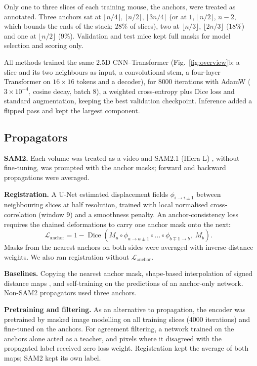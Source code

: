 Only one to three slices of each training mouse, the anchors, were treated as annotated. Three anchors sat at $\lfloor n/4\rfloor$, $\lfloor n/2\rfloor$, $\lfloor 3n/4\rfloor$ (or at $1$, $\lfloor n/2\rfloor$, $n-2$, which bounds the ends of the stack; 28\% of slices), two at $\lfloor n/3\rfloor$, $\lfloor 2n/3\rfloor$ (18\%) and one at $\lfloor n/2\rfloor$ (9\%). Validation and test mice kept full masks for model selection and scoring only.

All methods trained the same 2.5D CNN--Transformer (Fig.~\ref{fig:overview}b; a slice and its two neighbours as input, a convolutional stem, a four-layer Transformer on $16\times16$ tokens and a decoder), for 8000 iterations with AdamW ($3\times10^{-4}$, cosine decay, batch 8), a weighted cross-entropy plus Dice loss and standard augmentation, keeping the best validation checkpoint. Inference added a flipped pass and kept the largest component.

\subsection{Propagators}
\label{sec:prop}

\textbf{SAM2.} Each volume was treated as a video and SAM2.1 (Hiera-L) \cite{ravi2024sam2}, without fine-tuning, was prompted with the anchor masks; forward and backward propagations were averaged.

\textbf{Registration.} A U-Net estimated displacement fields $\phi_{i\to i\pm1}$ between neighbouring slices at half resolution, trained with local normalised cross-correlation (window 9) and a smoothness penalty. An anchor-consistency loss requires the chained deformations to carry one anchor mask onto the next:
\begin{equation}
\mathcal{L}_{\text{anchor}} = 1 - \operatorname{Dice}\!\left(M_a \circ \phi_{a\to a\pm1} \circ \dots \circ \phi_{b\mp1\to b},\; M_b\right).
\end{equation}
Masks from the nearest anchors on both sides were averaged with inverse-distance weights. We also ran registration without $\mathcal{L}_{\text{anchor}}$.

\textbf{Baselines.} Copying the nearest anchor mask, shape-based interpolation of signed distance maps \cite{raya1990shape}, and self-training \cite{bai2017semi} on the predictions of an anchor-only network. Non-SAM2 propagators used three anchors.

\textbf{Pretraining and filtering.} As an alternative to propagation, the encoder was pretrained by masked image modelling \cite{ali2025ssl} on all training slices (4000 iterations) and fine-tuned on the anchors. For agreement filtering, a network trained on the anchors alone acted as a teacher, and pixels where it disagreed with the propagated label received zero loss weight. Registration kept the average of both maps; SAM2 kept its own label.


